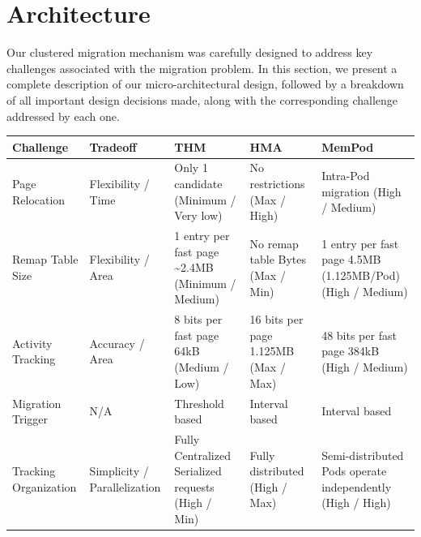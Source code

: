 \section{Architecture}
\label{sec:Architecture}

Our clustered migration mechanism was carefully designed to address key challenges associated with the migration problem. In this section, we present a complete description of our micro-architectural design, followed by a breakdown of all important design decisions made, along with the corresponding challenge addressed by each one.

\begin{table}[t]
\begin{tabularx}{\textwidth}{ |X|X|X|X|X| }
  \hline
    \textbf{Challenge} & \textbf{Tradeoff} & \textbf{THM} & \textbf{HMA} & \textbf{MemPod} \\ \hline       
    Page Relocation & Flexibility / Time & Only 1 candidate \newline (Minimum / Very low)& No restrictions \newline (Max / High) & Intra-Pod migration \newline (High / Medium) \\ \hline
    Remap Table Size & Flexibility / Area & 1 entry per fast page \newline \textasciitilde2.4MB \newline (Minimum / Medium) & No remap table \newline 0 Bytes \newline (Max / Min) & 1 entry per fast page \newline 4.5MB (1.125MB/Pod) \newline (High / Medium) \\ \hline
    Activity Tracking & Accuracy / Area & 8 bits per fast page \newline 64kB \newline (Medium / Low) & 16 bits per page \newline 1.125MB \newline (Max / Max) & 48 bits per fast page \newline 384kB \newline (High / Medium)\\ \hline
    Migration Trigger & N/A & Threshold based & Interval based & Interval based\\ \hline
    Tracking Organization & Simplicity / Parallelization & Fully Centralized \newline Serialized requests \newline (High / Min) & Fully distributed \newline (High / Max) & Semi-distributed \newline Pods operate independently \newline (High / High)\\ \hline

\end{tabularx}
\end{table}
